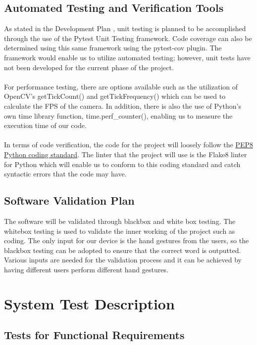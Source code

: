 \documentclass[12pt]{article}
\begin{document}
\subsection{Automated Testing and Verification Tools}

As stated in the Development Plan \citep{DevPlan}, unit testing is planned to be accomplished through the use of the Pytest Unit Testing framework. Code coverage can also 
be determined using this same framework using the pytest-cov plugin. The framework would enable us to utilize automated testing; however, unit tests have 
not been developed for the current phase of the project.\\
~\\
For performance testing, there are options available such as the utilization of OpenCV’s getTickCount() and getTickFrequency() which can be used to 
calculate the FPS of the camera. In addition, there is also the use of Python’s own time library function, time.perf\_counter(), enabling us to measure 
the execution time of our code.\\
~\\
In terms of code verification, the code for the project will loosely follow the \href{https://peps.python.org/pep-0008/}{PEP8 Python coding standard}. 
The linter that the project will use is the Flake8 linter for Python which will enable us to conform to this coding standard and catch syntactic errors that 
the code may have.

\subsection{Software Validation Plan}

The software will be validated through blackbox and white box  testing. The whitebox testing is used to validate the inner working of the project such as coding. The only input for our device is the hand gestures from the users, so the blackbox testing can be adopted to ensure that the correct word is outputted. Various inputs are needed for the validation process and it can be achieved by having different users perform different hand gestures.

\section{System Test Description}
	
\subsection{Tests for Functional Requirements}
\end{document}
